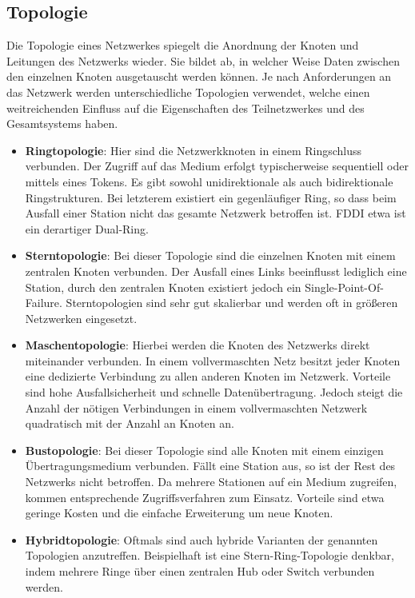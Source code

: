     \subsection{Topologie}
    Die Topologie eines Netzwerkes spiegelt die Anordnung der Knoten und Leitungen des Netzwerks wieder. Sie bildet ab, in welcher Weise Daten zwischen
    den einzelnen Knoten ausgetauscht werden können. Je nach Anforderungen an das Netzwerk werden unterschiedliche Topologien verwendet,
    welche einen weitreichenden Einfluss auf die Eigenschaften des Teilnetzwerkes und des Gesamtsystems haben.
        \begin{itemize}
            \item \textbf{Ringtopologie}: Hier sind die Netzwerkknoten in einem Ringschluss verbunden. Der Zugriff auf das Medium erfolgt typischerweise sequentiell 
            oder mittels eines Tokens. Es gibt sowohl unidirektionale als auch bidirektionale Ringstrukturen. Bei letzterem existiert ein gegenläufiger Ring, 
            so dass beim Ausfall einer Station nicht das gesamte Netzwerk betroffen ist. FDDI etwa ist ein derartiger Dual-Ring.
            \item \textbf{Sterntopologie}: Bei dieser Topologie sind die einzelnen Knoten mit einem zentralen Knoten verbunden. Der Ausfall eines Links beeinflusst lediglich
            eine Station, durch den zentralen Knoten existiert jedoch ein Single-Point-Of-Failure. Sterntopologien sind sehr gut skalierbar und werden oft in größeren Netzwerken eingesetzt.
            \item \textbf{Maschentopologie}: Hierbei werden die Knoten des Netzwerks direkt miteinander verbunden. In einem vollvermaschten Netz besitzt jeder Knoten eine 
            dedizierte Verbindung zu allen anderen Knoten im Netzwerk. Vorteile sind hohe Ausfallsicherheit und schnelle Datenübertragung. Jedoch steigt die Anzahl der 
            nötigen Verbindungen in einem vollvermaschten Netzwerk quadratisch mit der Anzahl an Knoten an.
            \item \textbf{Bustopologie}: Bei dieser Topologie sind alle Knoten mit einem einzigen Übertragungsmedium verbunden. Fällt eine Station aus, so ist der Rest des Netzwerks
            nicht betroffen. Da mehrere Stationen auf ein Medium zugreifen, kommen entsprechende Zugriffsverfahren zum Einsatz. Vorteile sind etwa geringe Kosten und die
            einfache Erweiterung um neue Knoten.
            \item \textbf{Hybridtopologie}: Oftmals sind auch hybride Varianten der genannten Topologien anzutreffen. Beispielhaft ist eine Stern-Ring-Topologie denkbar, indem
            mehrere Ringe über einen zentralen Hub oder Switch verbunden werden.
        \end{itemize}
